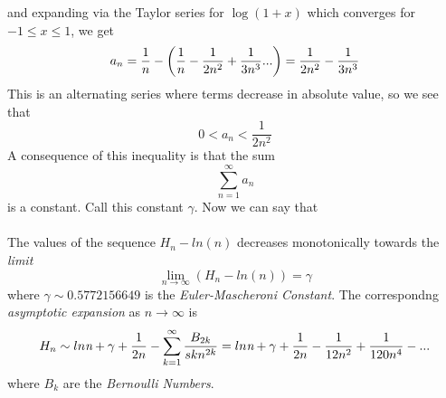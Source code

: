 \documentclass[2pt]{article}
\begin{document}
and expanding via the Taylor series for $\log{(1 + x)}$ which converges for $-1 \leq x \leq 1$, we get
\begin{equation}
a_{n} = \frac{1}{n} - \bigg{(}\frac{1}{n} -\frac{1}{2n^2}+\frac{1}{3n^3}...\bigg{)}=\frac{1}{2n^2}-\frac{1}{3n^3}
\end{equation}
This is an alternating series where terms decrease in absolute value, so we see that
\begin{equation}
0<a_n<\frac{1}{2n^2}
\end{equation}
A consequence of this inequality is that the sum 
\begin{equation}
\sum_{n=1}^{\infty} a_n
\end{equation}
is a constant. Call this constant $\gamma$. Now we can say that
\\\\
The values of the sequence $H_{n} - ln(n)$ decreases monotonically towards the \emph{limit}
\begin{equation}
\lim_{n \to \infty} (H_{n} - ln(n)) = \gamma\nonumber
\end{equation}
where $\gamma \sim 0.5772156649$ is the \emph{Euler-Mascheroni Constant}. The correspondng \emph{asymptotic expansion} as $n \to \infty$ is
\begin{equation}
H_{n} \sim ln \emph{n} + \gamma + \frac{1}{2n}-\sum_{k=1}^{\infty} \frac{B_{2k}}{skn^{2k}}=ln \emph{n} + \gamma + \frac{1}{2n} - \frac{1}{12n^2}+\frac{1}{120n^4}-...\nonumber
\end{equation}
where $B_{k}$ are the \emph{Bernoulli Numbers}.

\nocite{*}
{}

\end{document}
